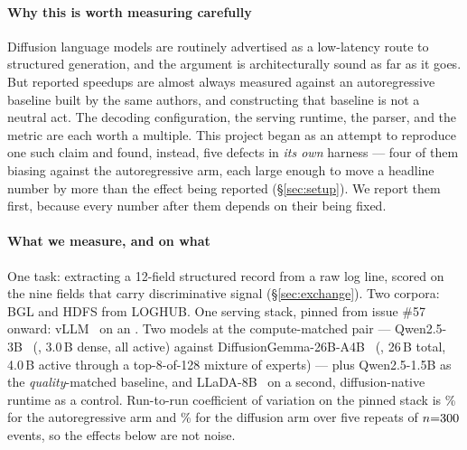 \paragraph{Why this is worth measuring carefully}
Diffusion language models are routinely advertised as a low-latency route to
structured generation, and the argument is architecturally sound as far as it
goes. But reported speedups are almost always measured against an
autoregressive baseline built by the same authors, and constructing that
baseline is not a neutral act. The decoding configuration, the serving
runtime, the parser, and the metric are each worth a multiple. This project
began as an attempt to reproduce one such claim and found, instead, five
defects in \emph{its own} harness --- four of them biasing against the
autoregressive arm, each large enough to move a headline number by more than
the effect being reported (\S\ref{sec:setup}). We report them first, because
every number after them depends on their being fixed.

\paragraph{What we measure, and on what}
One task: extracting a 12-field structured record from a raw log line, scored
on the nine fields that carry discriminative signal (\S\ref{sec:exchange}).
Two corpora: BGL and HDFS from LOGHUB. One serving stack, pinned from issue
\#57 onward: vLLM \vllmVersion\ on an \gpuModel. Two models at the
compute-matched pair --- Qwen2.5-3B~\cite{qwen25} (\ARthree, 3.0\,B dense, all
active) against DiffusionGemma-26B-A4B~\cite{diffusiongemma} (\DG, 26\,B
total, 4.0\,B active through a top-8-of-128 mixture of experts) --- plus
Qwen2.5-1.5B as the \emph{quality}-matched baseline, and
LLaDA-8B~\cite{llada2025} on a second, diffusion-native runtime as a control. Run-to-run coefficient of variation on the pinned stack
is \arCV\% for the autoregressive arm and \dgCV\% for the diffusion arm over
five repeats of $n{=}300$ events, so the effects below are not noise.

